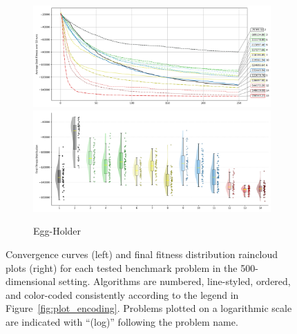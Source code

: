 \begin{figure}[H]
\begin{subfigure}{1\textwidth}
    \centering
    \includegraphics[width=.49\textwidth]{Figures/results/500/Egg_Holder_All_selected_algorithms_dim500_annot_legend.png}
    \includegraphics[width=.49\textwidth]{Figures/results/500/Egg_Holder_all_dim500_raincloud_vertical.png}
    \caption{Egg-Holder}
\end{subfigure}

\captionsetup{list=no}
\caption[Convergence curves and final fitness distribution raincloud plots for\\500-dimensional problems]{Convergence curves (left) and final fitness distribution raincloud plots (right) for each tested benchmark problem in the 500-dimensional setting. Algorithms are numbered, line-styled, ordered, and color-coded consistently according to the legend in Figure~\ref{fig:plot_encoding}. Problems plotted on a logarithmic scale are indicated with ``(log)'' following the problem name.}
\end{figure}





